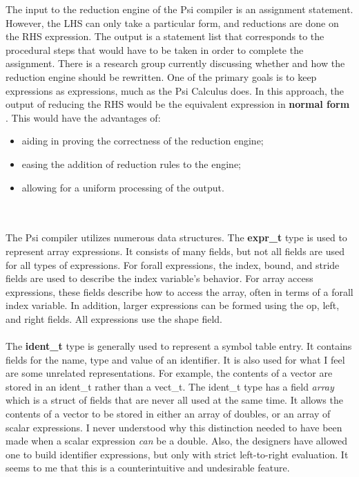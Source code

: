 \begin{itemize}
  The input to the reduction engine of the Psi compiler is an assignment
  statement.  However, the LHS can only take a particular form, and
  reductions are done on the RHS expression.  The output is a statement
  list that corresponds to the procedural steps that would have to be
  taken in order to complete the assignment.  There is a research group
  currently discussing whether and how the reduction engine should be
  rewritten.  One of the primary goals is to keep expressions as
  expressions, much as the Psi Calculus does.  In this approach, the
  output of reducing the RHS would be the equivalent expression in
  {\bf normal form } .  This would have the advantages of:
    \begin{itemize} 
    \item  aiding in proving the correctness of the reduction engine;
    \item  easing the addition of reduction rules to the engine;
    \item  allowing for a uniform processing of the output.
    \end{itemize} 
  \\ \\
  The Psi compiler utilizes numerous data structures.  The {\bf expr_t } 
  type is used to represent array expressions.  It consists of many
  fields, but not all fields are used for all types of expressions.  For
  forall expressions, the index, bound, and stride fields are used to
  describe the index variable's behavior.  For array access expressions,
  these fields describe how to access the array, often in terms of
  a forall index variable.  In addition, larger expressions can be formed
  using the op, left, and right fields.  All expressions use the shape
  field.\\ \\

  The {\bf ident_t }  type is generally used to represent a symbol table
  entry.  It contains fields for the name, type and value of an
  identifier.  It is also used for what I feel are some unrelated
  representations.  For example, the contents of a vector are stored
  in an ident_t rather than a vect_t.  The ident_t type has a field
  {\em array }  which is a struct of fields that are never all used
  at the same time.  It allows the contents of a vector to be stored
  in either an array of doubles, or an array of scalar expressions.
  I never understood why this distinction needed to have been made
  when a scalar expression {\em can }  be a double.  Also, the
  designers have allowed one to build identifier expressions, but
  only with strict left-to-right evaluation.  It seems to me that this
  is a counterintuitive and undesirable feature.\\ \\


\end{itemize}
